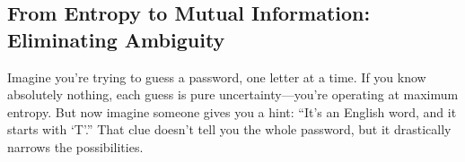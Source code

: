 









\subsection{From Entropy to Mutual Information: Eliminating Ambiguity}

Imagine you’re trying to guess a password, one letter at a time. If you know absolutely nothing, each guess is pure uncertainty—you’re operating at maximum entropy. But now imagine someone gives you a hint: “It’s an English word, and it starts with ‘T’.” That clue doesn’t tell you the whole password, but it drastically narrows the possibilities.






